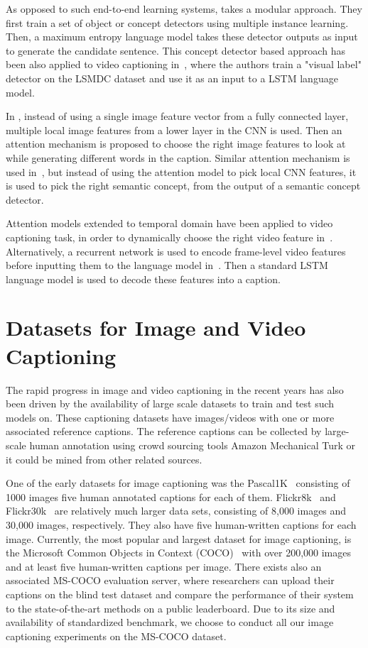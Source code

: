 As opposed to such end-to-end learning systems, \cite{Fang2015} takes a modular
approach. 
They first train a set of object or concept detectors using multiple instance
learning.
Then, a maximum entropy language model takes these detector outputs as input to
generate the candidate sentence.
This concept detector based approach has been also applied to video captioning
in~\cite{DBLP:journals/corr/RohrbachTRTPLCS16}, where the authors train a
"visual label" detector on the LSMDC dataset and use it as an input to a LSTM
language model.

In \cite{Xu2015show}, instead of using a single image feature vector from a
fully connected layer, multiple local image features from a lower layer in the
CNN is used.
Then an attention mechanism is proposed to choose the right image features to
look at while generating different words in the caption.
Similar attention mechanism is used in~\cite{you2016image}, but instead of using
the attention model to pick local CNN features, it is used to pick the right
semantic concept, from the output of a semantic concept detector.

Attention models extended to temporal domain have been applied to video
captioning task, in order to dynamically choose the right video feature
in~\cite{yao2015describing}.
%
Alternatively, a recurrent network is used to encode frame-level video features
before inputting them to the language model in~\cite{venugopalan2015sequence}.
Then a standard LSTM language model is used to decode these features into a
caption.
\section{Datasets for Image and Video Captioning}
The rapid progress in image and video captioning in the recent years has also been
driven by the availability of large scale datasets to train and test such models
on. 
These captioning datasets have images/videos with one or more associated
reference captions.
The reference captions can be collected by large-scale human annotation using
crowd sourcing tools Amazon Mechanical Turk or it could be mined from other
related sources. 

One of the early datasets for image captioning was the
Pascal1K~\cite{Rashtchian2010} consisting of 1000 images five human annotated
captions for each of them.
Flickr8k~\cite{Hodosh2013} and Flickr30k~\cite{Young2014} are relatively much
larger data sets, consisting of 8,000 images and 30,000 images, respectively. 
They also have five human-written captions for each image.
Currently, the most popular and largest dataset for image captioning, is the
Microsoft Common Objects in Context (COCO)~\cite{Lin2014} with over 200,000
images and at least five human-written captions per image.
There exists also an associated MS-COCO evaluation server, where researchers can
upload their captions on the blind test dataset and compare the performance of
their system to the state-of-the-art methods on a public leaderboard.
Due to its size and availability of standardized benchmark, we choose to conduct
all our image captioning experiments on the MS-COCO dataset. 

